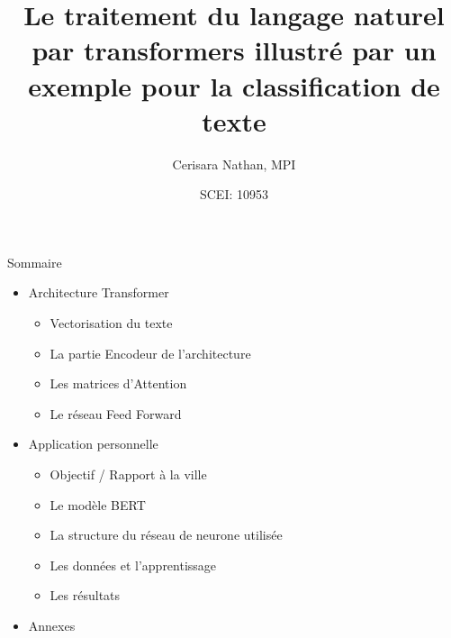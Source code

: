 \documentclass[12pt]{beamer}
\title{Le traitement du langage naturel par transformers illustré par un exemple pour la classification de texte}
\author{Cerisara Nathan, MPI}
\date{SCEI: 10953}
\begin{document}
\maketitle


\begin{frame}{Sommaire}

\begin{itemize}
  \item Architecture Transformer
  	\begin{itemize}
  		\item Vectorisation du texte
  		\item La partie Encodeur de l'architecture
  		\item Les matrices d'Attention
  		\item Le réseau Feed Forward
  	\end{itemize}
  \vspace{7px}
  \item Application personnelle
     \begin{itemize}
      		\item Objectif / Rapport à la ville
      		\item Le modèle BERT
      		\item La structure du réseau de neurone utilisée
      		\item Les données et l'apprentissage
      		\item Les résultats
     \end{itemize}
     \vspace{7px}
     \item Annexes
\end{itemize}

\end{frame}

\end{document}
